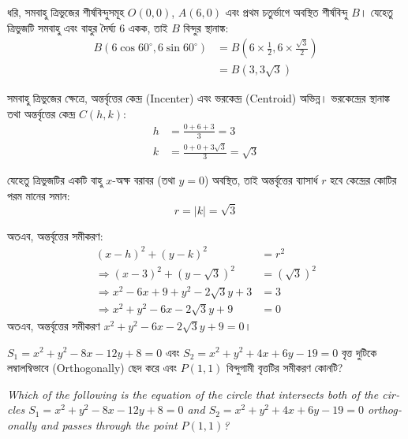 \documentclass[12pt, a4paper]{article}
\begin{document}
\begin{tcolorbox}[solutionbox={সমাধান (Solution)}]
    \noindent
    ধরি, সমবাহু ত্রিভুজের শীর্ষবিন্দুসমূহ $O(0, 0)$, $A(6, 0)$ এবং প্রথম চতুর্ভাগে অবস্থিত শীর্ষবিন্দু $B$। 
    যেহেতু ত্রিভুজটি সমবাহু এবং বাহুর দৈর্ঘ্য $6$ একক, তাই $B$ বিন্দুর স্থানাঙ্ক:
    \begin{align*}
        B\left(6\cos 60^{\circ}, 6\sin 60^{\circ}\right) &= B\left(6 \times \frac{1}{2}, 6 \times \frac{\sqrt{3}}{2}\right) \\
                                                       &= B(3, 3\sqrt{3})
    \end{align*}
    
    সমবাহু ত্রিভুজের ক্ষেত্রে, অন্তর্বৃত্তের কেন্দ্র (Incenter) এবং ভরকেন্দ্র (Centroid) অভিন্ন। ভরকেন্দ্রের স্থানাঙ্ক তথা অন্তর্বৃত্তের কেন্দ্র $C(h, k)$:
    \begin{align*}
        h &= \frac{0 + 6 + 3}{3} = 3 \\
        k &= \frac{0 + 0 + 3\sqrt{3}}{3} = \sqrt{3}
    \end{align*}
    
    যেহেতু ত্রিভুজটির একটি বাহু $x$-অক্ষ বরাবর (তথা $y = 0$) অবস্থিত, তাই অন্তর্বৃত্তের ব্যাসার্ধ $r$ হবে কেন্দ্রের কোটির পরম মানের সমান:
    \[ r = |k| = \sqrt{3} \]
    
    অতএব, অন্তর্বৃত্তের সমীকরণ: 
    \begin{align*}
        (x - h)^2 + (y - k)^2 &= r^2 \\
        \Rightarrow (x - 3)^2 + (y - \sqrt{3})^2 &= (\sqrt{3})^2 \\
        \Rightarrow x^2 - 6x + 9 + y^2 - 2\sqrt{3}y + 3 &= 3 \\
        \Rightarrow x^2 + y^2 - 6x - 2\sqrt{3}y + 9 &= 0
    \end{align*}
    অতএব, অন্তর্বৃত্তের সমীকরণ \textbf{$x^2 + y^2 - 6x - 2\sqrt{3}y + 9 = 0$}।
\end{tcolorbox}

\vspace{2em}

\begin{tcolorbox}[questionbox={প্রশ্ন (Question) 25}]
    \noindent
    $S_1 = x^2 + y^2 - 8x - 12y + 8 = 0$ এবং $S_2 = x^2 + y^2 + 4x + 6y - 19 = 0$ বৃত্ত দুটিকে লম্বালম্বিভাবে (Orthogonally) ছেদ করে এবং $P(1, 1)$ বিন্দুগামী বৃত্তটির সমীকরণ কোনটি?
    
    \vspace{0.8em}
    \begin{english}
    \noindent\textit{\color{darkgray}
    Which of the following is the equation of the circle that intersects both of the circles $S_1 = x^2 + y^2 - 8x - 12y + 8 = 0$ and $S_2 = x^2 + y^2 + 4x + 6y - 19 = 0$ orthogonally and passes through the point $P(1, 1)$?
    }
    \end{english}
\end{tcolorbox}
\end{document}
